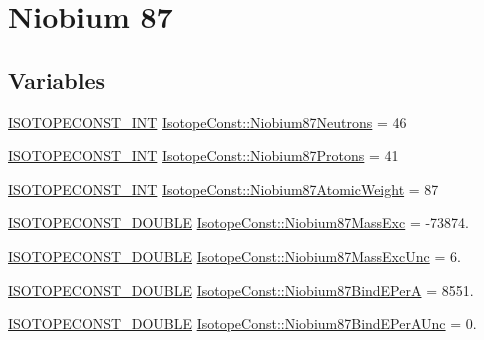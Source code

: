 \hypertarget{group___isotope_const-_niobium-_nb87}{}\section{Niobium 87}
\label{group___isotope_const-_niobium-_nb87}
\subsection*{Variables}
\begin{DoxyCompactItemize}
\item 
\mbox{\hyperlink{group___isotope_const-_macros_ga5f18360b3e99483a35c32d789e62621c}{I\+S\+O\+T\+O\+P\+E\+C\+O\+N\+S\+T\+\_\+\+I\+NT}} \mbox{\hyperlink{group___isotope_const-_niobium-_nb87_gac9b193888b55d8d374b01e962b91ea01}{Isotope\+Const\+::\+Niobium87\+Neutrons}} = 46
\item 
\mbox{\hyperlink{group___isotope_const-_macros_ga5f18360b3e99483a35c32d789e62621c}{I\+S\+O\+T\+O\+P\+E\+C\+O\+N\+S\+T\+\_\+\+I\+NT}} \mbox{\hyperlink{group___isotope_const-_niobium-_nb87_ga7554f294b2b35c3c3d99f26f3c39696d}{Isotope\+Const\+::\+Niobium87\+Protons}} = 41
\item 
\mbox{\hyperlink{group___isotope_const-_macros_ga5f18360b3e99483a35c32d789e62621c}{I\+S\+O\+T\+O\+P\+E\+C\+O\+N\+S\+T\+\_\+\+I\+NT}} \mbox{\hyperlink{group___isotope_const-_niobium-_nb87_ga6d6a3d2988fdf93fc96b8a2e4680356d}{Isotope\+Const\+::\+Niobium87\+Atomic\+Weight}} = 87
\item 
\mbox{\hyperlink{group___isotope_const-_macros_ga8f45a7272ce02c0b4c65c44636ed719a}{I\+S\+O\+T\+O\+P\+E\+C\+O\+N\+S\+T\+\_\+\+D\+O\+U\+B\+LE}} \mbox{\hyperlink{group___isotope_const-_niobium-_nb87_ga053c38d20f271a2eec825c45e2077183}{Isotope\+Const\+::\+Niobium87\+Mass\+Exc}} = -\/73874.
\item 
\mbox{\hyperlink{group___isotope_const-_macros_ga8f45a7272ce02c0b4c65c44636ed719a}{I\+S\+O\+T\+O\+P\+E\+C\+O\+N\+S\+T\+\_\+\+D\+O\+U\+B\+LE}} \mbox{\hyperlink{group___isotope_const-_niobium-_nb87_gabed34d0174f5406c40518a3c0a99b4de}{Isotope\+Const\+::\+Niobium87\+Mass\+Exc\+Unc}} = 6.
\item 
\mbox{\hyperlink{group___isotope_const-_macros_ga8f45a7272ce02c0b4c65c44636ed719a}{I\+S\+O\+T\+O\+P\+E\+C\+O\+N\+S\+T\+\_\+\+D\+O\+U\+B\+LE}} \mbox{\hyperlink{group___isotope_const-_niobium-_nb87_ga90d5302539fcb7104f320894681b7db8}{Isotope\+Const\+::\+Niobium87\+Bind\+E\+PerA}} = 8551.
\item 
\mbox{\hyperlink{group___isotope_const-_macros_ga8f45a7272ce02c0b4c65c44636ed719a}{I\+S\+O\+T\+O\+P\+E\+C\+O\+N\+S\+T\+\_\+\+D\+O\+U\+B\+LE}} \mbox{\hyperlink{group___isotope_const-_niobium-_nb87_ga2a13304c73a4372d5f48d94cd84ed402}{Isotope\+Const\+::\+Niobium87\+Bind\+E\+Per\+A\+Unc}} = 0.

\end{DoxyCompactItemize}
